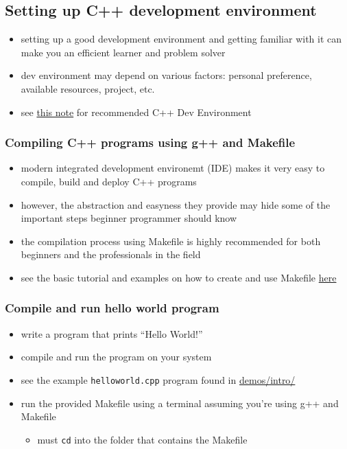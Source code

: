 \documentclass[11pt]{article}
\providecommand{\tightlist}{%
      \setlength{\itemsep}{0pt}\setlength{\parskip}{0pt}}
\begin{document}
    \hypertarget{setting-up-c-development-environment}{%
\subsection{Setting up C++ development
environment}\label{setting-up-c-development-environment}}

\begin{itemize}
\tightlist
\item
  setting up a good development environment and getting familiar with it
  can make you an efficient learner and problem solver
\item
  dev environment may depend on various factors: personal preference,
  available resources, project, etc.
\item
  see \href{./DevEnvironmentSetup.pdf}{this note} for recommended C++
  Dev Environment
\end{itemize}

\hypertarget{compiling-c-programs-using-g-and-makefile}{%
\subsubsection{Compiling C++ programs using g++ and
Makefile}\label{compiling-c-programs-using-g-and-makefile}}

\begin{itemize}
\tightlist
\item
  modern integrated development environemt (IDE) makes it very easy to
  compile, build and deploy C++ programs
\item
  however, the abstraction and easyness they provide may hide some of
  the important steps beginner programmer should know
\item
  the compilation process using Makefile is highly recommended for both
  beginners and the professionals in the field
\item
  see the basic tutorial and examples on how to create and use Makefile
  \href{DevEnvironmentSetup.pdf}{here}
\end{itemize}

\hypertarget{compile-and-run-hello-world-program}{%
\subsubsection{Compile and run hello world
program}\label{compile-and-run-hello-world-program}}

\begin{itemize}
\tightlist
\item
  write a program that prints ``Hello World!''
\item
  compile and run the program on your system
\item
  see the example \texttt{helloworld.cpp} program found in
  \url{demos/intro/}
\item
  run the provided Makefile using a terminal assuming you're using g++
  and Makefile

  \begin{itemize}
  \tightlist
  \item
    must \texttt{cd} into the folder that contains the Makefile
  \end{itemize}
\end{itemize}
\end{document}
